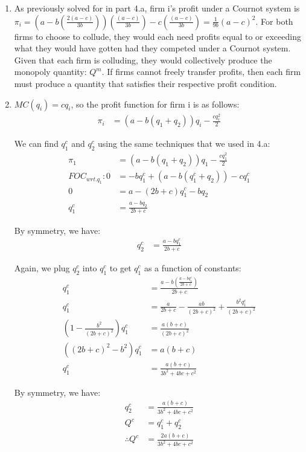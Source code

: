 \documentclass[12pt,letterpaper]{article}
\begin{document}
\begin{enumerate}
\begin{enumerate}
    \item As previously solved for in part 4.a, firm i's profit under a Cournot system is $\pi_i = (a-b(\frac{2(a-c)}{3b}))(\frac{(a-c)}{3b}) - c(\frac{(a-c)}{3b}) = \frac{1}{9b}(a-c)^2$. For both firms to choose to collude, they would each need profits equal to or exceeding what they would have gotten had they competed under a Cournot system. Given that each firm is colluding, they would collectively produce the monopoly quantity: $Q^m$. If firms cannot freely transfer profits, then each firm must produce a quantity that satisfies their respective profit condition.
    
    \item $MC(q_i) = cq_i$, so the profit function for firm i is as follows:
    \begin{align*}
        \pi_i &= (a - b(q_1 + q_2))q_i - \frac{cq_i^2}{2}
    \end{align*}
    
    We can find $q_1^c$ and $q_2^c$ using the same techniques that we used in 4.a:
    \begin{align*}
        \pi_1 &= (a - b(q_1 + q_2))q_1 - \frac{cq_1^2}{2}\\
        FOC_{wrt.q_1}: 0 &= -bq_1^c + (a-b(q_1^c + q_2)) - cq_1^c\\
        0 &= a - (2b + c)q_1^c - bq_2\\
        q_1^c &= \frac{a - bq_2}{2b + c}
    \end{align*}
    
    By symmetry, we have:
    \begin{align*}
        q_2^c &= \frac{a - bq_1^c}{2b + c}
    \end{align*}
    
    Again, we plug $q_2^c$ into $q_1^c$ to get $q_1^c$ as a function of constants:
    \begin{align*}
        q_1^c &= \frac{a - b(\frac{a - bq_1^c}{2b + c})}{2b + c}\\
        q_1^c &= \frac{a}{2b+c} - \frac{ab}{(2b+c)^2} + \frac{b^2q_1^c}{(2b+c)^2}\\
        (1-\frac{b^2}{(2b+c)^2})q_1^c &= \frac{a(b+c)}{(2b+c)^2}\\
        ((2b+c)^2 - b^2)q_1^c &= a(b+c)\\
        q_1^c &= \frac{a(b+c)}{3b^2 + 4bc + c^2}
    \end{align*}
    
    By symmetry, we have:
    \begin{align*}
        q_2^c &= \frac{a(b+c)}{3b^2 + 4bc + c^2}\\
        Q^c &= q_1^c + q_2^c\\
        \therefore Q^c &= \frac{2a(b+c)}{3b^2 + 4bc + c^2}
    \end{align*}
    

\end{enumerate}
\end{enumerate}
\end{document}
